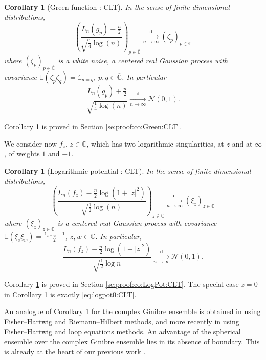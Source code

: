 \documentclass[10pt,reqno]{amsart}
\numberwithin{equation}{section}
\numberwithin{figure}{section}
\theoremstyle{plain}
\newtheorem{corollary}[theorem]{Corollary}
\newcommand{\<}{\langle}
\renewcommand{\>}{\rangle}
\begin{document}
\begin{corollary}[Green function : CLT]\label{co:Green:CLT}
 In the sense of finite-dimensional distributions,
 \begin{equation}\label{eq:Green:multi}
 {\left(\frac{L_n(g_p)+\frac{n}{2}}{\sqrt{\frac{1}{4}\log(n)}}\right)}_{p\in\overline{\mathbb{C}}}
 \xrightarrow[n\to\infty]{\mathrm{d}}
 {(\zeta_p)}_{p\in \overline{\mathbb{C}}}
 \end{equation}
 where ${(\zeta_p)}_{p\in{\overline{\mathbb{C}}}}$ is a white noise, a centered real Gaussian process with covariance $\mathbb{E}(\zeta_p\zeta_q)=\mathbb{1}_{p=q}$, $p,q\in \overline{\mathbb{C}}$. In particular
 \begin{equation}
 \frac{L_n(g_p)+\frac{n}{2}}{\sqrt{\frac{1}{4}\log(n)}}
 \xrightarrow[n\to\infty]{\mathrm{d}}
 \mathcal{N}(0,1)\label{eq:Green:CLT}.
 \end{equation}
\end{corollary}

Corollary \ref{co:Green:CLT} is proved in Section \ref{se:proof:co:Green:CLT}.

We consider now $f_z$, $z\in\mathbb{C}$, which has two logarithmic singularities, at $z$ and at $\infty$, of weights $1$ and $-1$.

\begin{corollary}[Logarithmic potential : CLT]\label{co:LogPot:CLT}
 In the sense of finite dimensional distributions,
  \begin{equation}\label{eq:LogPot:multi}
 {\left(\frac{L_n(f_z)-\frac{n}{2}\log(1+|z|^2)}{\sqrt{\frac{1}{2}\log(n)}}\right)}_{z\in\mathbb{C}}
 \xrightarrow[n\to\infty]{\mathrm{d}}
 {(\xi_z)}_{z\in\mathbb{C}}
 \end{equation}
 where ${(\xi_z)}_{z\in\mathbb{C}}$ is a centered real Gaussian process with covariance $\mathbb{E}(\xi_z\xi_w)=\frac{\mathbb{1}_{z=w}+1}{2}$, $z,w\in\mathbb{C}$. In particular,
 \begin{equation}
	  \frac{L_n(f_z)-\frac{n}{2}\log(1+|z|^2)}{\sqrt{\frac12\log n}}
    \xrightarrow[n\to\infty]{\mathrm{d}}\mathcal{N}(0,1).\label{eq:logpot:CLT}
 \end{equation}
\end{corollary}

Corollary \ref{co:LogPot:CLT} is proved in Section \ref{se:proof:co:LogPot:CLT}.
The special case $z=0$ in Corollary \ref{co:LogPot:CLT} is exactly \eqref{eq:logpot0:CLT}.

An analogue of Corollary \ref{co:LogPot:CLT} for the complex Ginibre ensemble is
obtained in \cite{MR3946715} using Fisher--Hartwig and Riemann--Hilbert
methods, and more recently in \cite{bourgadeetal} using Fisher--Hartwig and
loop equations methods. An advantage of the spherical ensemble over the complex
Ginibre ensemble lies in its absence of boundary. This is already at the heart of our previous work \cite{chafai-garcia-zelada-xu}.
\end{document}
